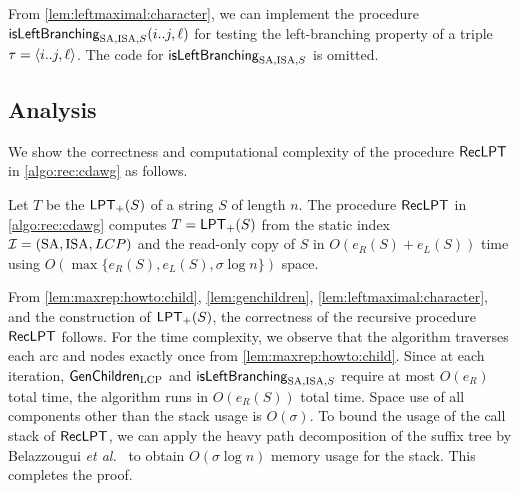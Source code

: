 \documentclass{article}
\begin{document}
From \cref{lem:leftmaximal:character}, we can implement the procedure $\mbox{\textsf{isLeftBranching}}_{{\mathrm{SA}, \mathrm{ISA}, S}}(i..j, \ell)$ for testing the left-branching property of a triple $\tau = \langle i..j, \ell\rangle$. The code for $\mbox{\textsf{isLeftBranching}}_{{\mathrm{SA}, \mathrm{ISA}, S}}$ is omitted. 



\subsection{Analysis}

We show the correctness and computational complexity of the procedure $\textsf{RecLPT}$ in \cref{algo:rec:cdawg} as follows. 

\begin{lemmarep}\label{lem:main:from:lpt:to:cdawg:correct:time}
  Let $T$ be the $\mathsf{LPT}_{+}(S)$ of a string $S$ of length $n$. 
  The procedure $\textsf{RecLPT}$ in \cref{algo:rec:cdawg} computes $T = \mathsf{LPT}_{+}(S)$ from the static index $\mathcal{I} = (\mathrm{SA}, \mathrm{ISA}, LCP)$ and the read-only copy of $S$
  in $O(e_R(S) + e_L(S))$ time using $O(\max\{e_R(S), e_L(S), \sigma\log n\})$ space. 
\end{lemmarep}

\begin{proofsketch}
  From
\cref{lem:maxrep:howto:child},
\cref{lem:genchildren},
\cref{lem:leftmaximal:character},
and the construction of $\mathsf{LPT}_{+}(S)$,
the correctness of the recursive procedure $\textsf{RecLPT}$ follows.
For the time complexity, we observe that the algorithm traverses each arc and nodes exactly once from \cref{lem:maxrep:howto:child}. Since at each iteration, $\textsf{GenChildren}_{{\mathrm{LCP}}}$ and $\mbox{\textsf{isLeftBranching}}_{{\mathrm{SA}, \mathrm{ISA}, S}}$ require at most $O(e_R)$ total time, the algorithm runs in $O(e_R(S))$ total time. Space use of all components other than the stack usage is $O(\sigma)$. To bound the usage of the call stack of $\textsf{RecLPT}$, we can apply the heavy path decomposition of the suffix tree by Belazzougui \textit{et al.}~\cite{belazzougui2020linear} to obtain $O(\sigma \log n)$ memory usage for the stack. This completes the proof. 
\end{proofsketch}
\end{document}
